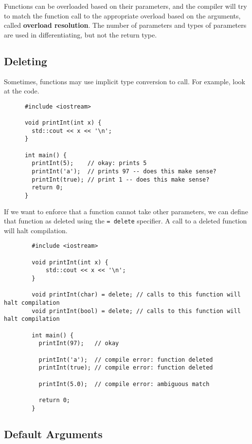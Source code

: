 \documentclass{article}
\begin{document}
    Functions can be overloaded based on their parameters, and the compiler will try to match the function call to the appropriate overload based on the arguments, called \textbf{overload resolution}. The number of parameters and types of parameters are used in differentiating, but not the return type. 

  \subsection{Deleting}

    Sometimes, functions may use implicit type conversion to call. For example, look at the code. 

    \begin{lstlisting}
      #include <iostream>

      void printInt(int x) {
        std::cout << x << '\n';
      }

      int main() {
        printInt(5);    // okay: prints 5
        printInt('a');  // prints 97 -- does this make sense?
        printInt(true); // print 1 -- does this make sense?
        return 0;
      }
    \end{lstlisting}

    \begin{definition}
      If we want to enforce that a function cannot take other parameters, we can define that function as deleted using the \texttt{= delete} specifier. A call to a deleted function will halt compilation. 
      \begin{lstlisting}
        #include <iostream>

        void printInt(int x) {
            std::cout << x << '\n';
        }

        void printInt(char) = delete; // calls to this function will halt compilation
        void printInt(bool) = delete; // calls to this function will halt compilation

        int main() {
          printInt(97);   // okay

          printInt('a');  // compile error: function deleted
          printInt(true); // compile error: function deleted

          printInt(5.0);  // compile error: ambiguous match

          return 0;
        } 
      \end{lstlisting}
    \end{definition}

  \subsection{Default Arguments} 
\end{document}
